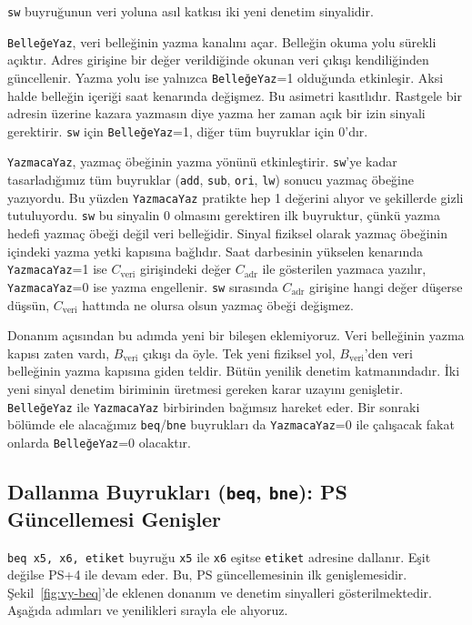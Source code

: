 \texttt{sw} buyruğunun veri yoluna asıl katkısı iki yeni denetim sinyalidir.

\texttt{BelleğeYaz}, veri belleğinin yazma kanalını açar. Belleğin okuma yolu sürekli açıktır. Adres girişine bir değer verildiğinde okunan veri çıkışı kendiliğinden güncellenir. Yazma yolu ise yalnızca \texttt{BelleğeYaz}=1 olduğunda etkinleşir. Aksi halde belleğin içeriği saat kenarında değişmez. Bu asimetri kasıtlıdır. Rastgele bir adresin üzerine kazara yazmasın diye yazma her zaman açık bir izin sinyali gerektirir. \texttt{sw} için \texttt{BelleğeYaz}=1, diğer tüm buyruklar için 0'dır.

\texttt{YazmacaYaz}, yazmaç öbeğinin yazma yönünü etkinleştirir. \texttt{sw}'ye kadar tasarladığımız tüm buyruklar (\texttt{add}, \texttt{sub}, \texttt{ori}, \texttt{lw}) sonucu yazmaç öbeğine yazıyordu. Bu yüzden \texttt{YazmacaYaz} pratikte hep 1 değerini alıyor ve şekillerde gizli tutuluyordu. \texttt{sw} bu sinyalin 0 olmasını gerektiren ilk buyruktur, çünkü yazma hedefi yazmaç öbeği değil veri belleğidir. Sinyal fiziksel olarak yazmaç öbeğinin içindeki yazma yetki kapısına bağlıdır. Saat darbesinin yükselen kenarında \texttt{YazmacaYaz}=1 ise $C_{\text{veri}}$ girişindeki değer $C_{\text{adr}}$ ile gösterilen yazmaca yazılır, \texttt{YazmacaYaz}=0 ise yazma engellenir. \texttt{sw} sırasında $C_{\text{adr}}$ girişine hangi değer düşerse düşsün, $C_{\text{veri}}$ hattında ne olursa olsun yazmaç öbeği değişmez.

Donanım açısından bu adımda yeni bir bileşen eklemiyoruz. Veri belleğinin yazma kapısı zaten vardı, $B_{\text{veri}}$ çıkışı da öyle. Tek yeni fiziksel yol, $B_{\text{veri}}$'den veri belleğinin yazma kapısına giden teldir. Bütün yenilik denetim katmanındadır. İki yeni sinyal denetim biriminin üretmesi gereken karar uzayını genişletir. \texttt{BelleğeYaz} ile \texttt{YazmacaYaz} birbirinden bağımsız hareket eder. Bir sonraki bölümde ele alacağımız \texttt{beq}/\texttt{bne} buyrukları da \texttt{YazmacaYaz}=0 ile çalışacak fakat onlarda \texttt{BelleğeYaz}=0 olacaktır.

\subsection{Dallanma Buyrukları (\texttt{beq}, \texttt{bne}): PS Güncellemesi Genişler}
\label{subsec:vy-beq}

\texttt{beq x5, x6, etiket} buyruğu \texttt{x5} ile \texttt{x6} eşitse \texttt{etiket} adresine dallanır. Eşit değilse PS+4 ile devam eder. Bu, PS güncellemesinin ilk genişlemesidir. Şekil~\ref{fig:vy-beq}'de eklenen donanım ve denetim sinyalleri gösterilmektedir. Aşağıda adımları ve yenilikleri sırayla ele alıyoruz.

